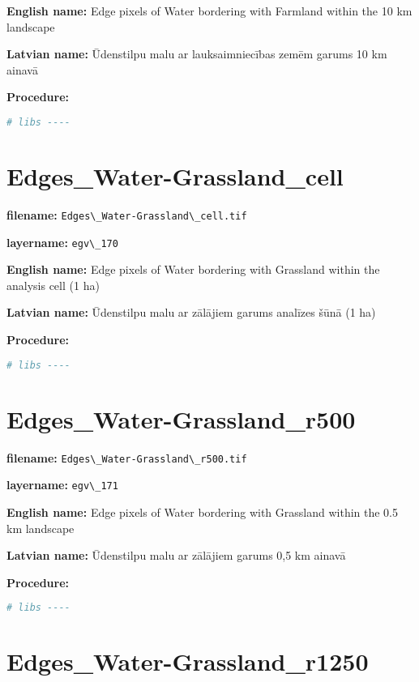\documentclass[
]{book}
\newcommand{\passthrough}[1]{#1}
\begin{document}
\textbf{English name:} Edge pixels of Water bordering with Farmland within the 10 km landscape

\textbf{Latvian name:} Ūdenstilpu malu ar lauksaimniecības zemēm garums 10 km ainavā

\textbf{Procedure:}

\begin{lstlisting}[language=R]
# libs ----
\end{lstlisting}

\section{Edges\_Water-Grassland\_cell}\label{ch06.170}

\textbf{filename:} \passthrough{\lstinline!Edges\_Water-Grassland\_cell.tif!}

\textbf{layername:} \passthrough{\lstinline!egv\_170!}

\textbf{English name:} Edge pixels of Water bordering with Grassland within the analysis cell (1 ha)

\textbf{Latvian name:} Ūdenstilpu malu ar zālājiem garums analīzes šūnā (1 ha)

\textbf{Procedure:}

\begin{lstlisting}[language=R]
# libs ----
\end{lstlisting}

\section{Edges\_Water-Grassland\_r500}\label{ch06.171}

\textbf{filename:} \passthrough{\lstinline!Edges\_Water-Grassland\_r500.tif!}

\textbf{layername:} \passthrough{\lstinline!egv\_171!}

\textbf{English name:} Edge pixels of Water bordering with Grassland within the 0.5 km landscape

\textbf{Latvian name:} Ūdenstilpu malu ar zālājiem garums 0,5 km ainavā

\textbf{Procedure:}

\begin{lstlisting}[language=R]
# libs ----
\end{lstlisting}

\section{Edges\_Water-Grassland\_r1250}\label{ch06.172}
\end{document}
